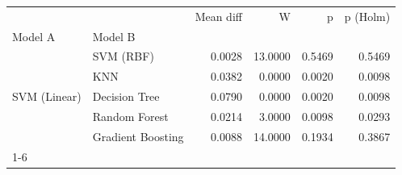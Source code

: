 \begin{table}
\label{tab:Ext08_wilcoxon_vs_linear_svm_repeat0}
\begin{tabular}{llrrrr}
\toprule
 &  & Mean diff & W & p & p (Holm) \\
Model A & Model B &  &  &  &  \\
\midrule
\multirow[t]{5}{*}{SVM (Linear)} & SVM (RBF) & 0.0028 & 13.0000 & 0.5469 & 0.5469 \\
 & KNN & 0.0382 & 0.0000 & 0.0020 & 0.0098 \\
 & Decision Tree & 0.0790 & 0.0000 & 0.0020 & 0.0098 \\
 & Random Forest & 0.0214 & 3.0000 & 0.0098 & 0.0293 \\
 & Gradient Boosting & 0.0088 & 14.0000 & 0.1934 & 0.3867 \\
\cline{1-6}
\bottomrule
\end{tabular}
\end{table}
